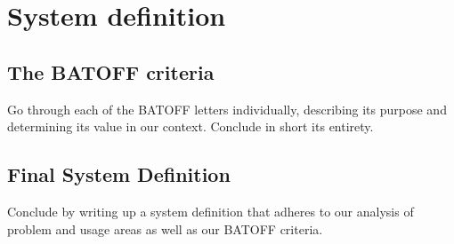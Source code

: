 \section{System definition}
\subsection{The BATOFF criteria}
Go through each of the BATOFF letters individually, describing its purpose and determining its value in our context.
Conclude in short its entirety.
\subsection{Final System Definition}
Conclude by writing up a system definition that adheres to our analysis of problem and usage areas as well as our BATOFF criteria.